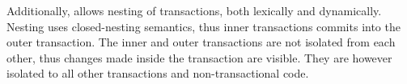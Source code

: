 Additionally, \stmnamesp allows nesting of transactions, both lexically and dynamically. Nesting uses closed-nesting semantics, thus inner transactions commits into the outer transaction. The inner and outer transactions are not isolated from each other, thus changes made inside the transaction are visible. They are however isolated to all other transactions and non-transactional code.


%
%
%
%    
%
%    
         
         



\worksheetend
